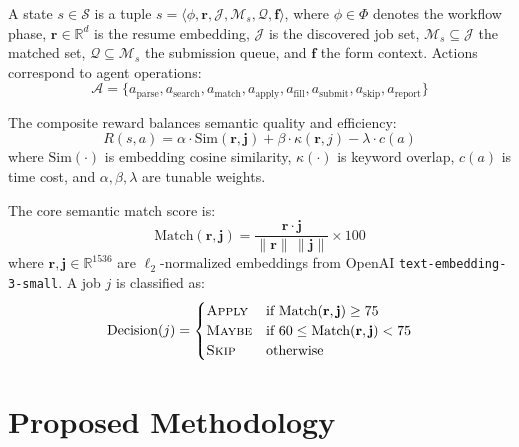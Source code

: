 \documentclass[conference]{IEEEtran}
\begin{document}
A state $s \in \mathcal{S}$ is a tuple $s = \langle \phi, \mathbf{r}, \mathcal{J}, \mathcal{M}_s, \mathcal{Q}, \mathbf{f} \rangle$, where $\phi \in \Phi$ denotes the workflow phase, $\mathbf{r} \in \mathbb{R}^d$ is the resume embedding, $\mathcal{J}$ is the discovered job set, $\mathcal{M}_s \subseteq \mathcal{J}$ the matched set, $\mathcal{Q} \subseteq \mathcal{M}_s$ the submission queue, and $\mathbf{f}$ the form context. Actions correspond to agent operations:
\begin{equation}
    \mathcal{A} = \{ a_{\text{parse}}, a_{\text{search}}, a_{\text{match}}, a_{\text{apply}}, a_{\text{fill}}, a_{\text{submit}}, a_{\text{skip}}, a_{\text{report}} \}
\end{equation}

The composite reward balances semantic quality and efficiency:
\begin{equation}
\label{eq:reward}
    R(s, a) = \alpha \cdot \text{Sim}(\mathbf{r}, \mathbf{j}) + \beta \cdot \kappa(\mathbf{r}, j) - \lambda \cdot c(a)
\end{equation}
where $\text{Sim}(\cdot)$ is embedding cosine similarity, $\kappa(\cdot)$ is keyword overlap, $c(a)$ is time cost, and $\alpha, \beta, \lambda$ are tunable weights.

The core semantic match score is:
\begin{equation}
\label{eq:match}
    \text{Match}(\mathbf{r}, \mathbf{j}) = \frac{\mathbf{r} \cdot \mathbf{j}}{\|\mathbf{r}\| \, \|\mathbf{j}\|} \times 100
\end{equation}
where $\mathbf{r}, \mathbf{j} \in \mathbb{R}^{1536}$ are $\ell_2$-normalized embeddings from OpenAI \texttt{text-embedding-3-small}. A job $j$ is classified as:
\begin{equation}
    \text{Decision}(j) = \begin{cases}
        \textsc{Apply} & \text{if } \text{Match}(\mathbf{r}, \mathbf{j}) \geq 75 \\
        \textsc{Maybe} & \text{if } 60 \leq \text{Match}(\mathbf{r}, \mathbf{j}) < 75 \\
        \textsc{Skip}  & \text{otherwise}
    \end{cases}
\end{equation}

\section{Proposed Methodology}
\end{document}
